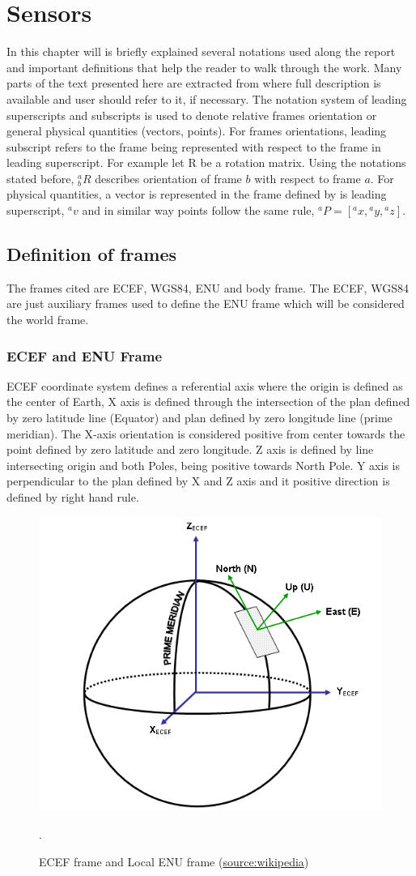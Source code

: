 \chapter{Sensors}
\label{chapter:Sensors}

In this chapter will is briefly explained several notations used along the report and
important definitions that help the reader to walk through the work. Many parts of the text presented here are extracted from \cite{thesis_BT} where full description is available and user should refer to it, if necessary. 
The notation system of leading superscripts and subscripts is used to denote
relative frames orientation or general physical quantities (vectors, points).
For frames orientations, leading subscript refers to the frame being represented
with respect to the frame in leading superscript. For example let R be a
rotation matrix. Using the notations stated before, ${}^a_bR$ describes
orientation of frame $b$ with respect to frame $a$. For physical quantities, a
vector is represented in the frame defined by is leading superscript,
${}^av$ and in similar way points follow the same rule,
${}^aP=[{}^ax,{}^ay,{}^az]$.


\section{Definition of frames} \label{section:frames}

The frames cited are \gls{ECEF}, \gls{WGS84},
\gls{ENU} and body frame. The \gls{ECEF}, \gls{WGS84} are just auxiliary frames
used to define the \gls{ENU} frame which will be considered the world frame.


\subsection{ECEF and ENU Frame}

\gls{ECEF} coordinate system defines a referential axis where the origin is
defined as the center of Earth, X axis is defined through the intersection of
the plan defined by zero latitude line (Equator) and plan defined by zero
longitude line (prime meridian). The X-axis orientation is considered positive
from center towards the point defined by zero latitude and zero longitude. Z axis
is defined by line intersecting origin and both Poles, being positive towards
North Pole. Y axis is perpendicular to the plan defined by X and Z axis and it
positive direction is defined by right hand rule.

\begin{figure}[!htb]
	\centering
	\includegraphics[width=0.3\linewidth]{figures/EarthTangentialPlane.png}
	\caption[ECEF frame and Local ENU frame.]{ECEF frame and Local ENU frame (\href{https://en.wikipedia.org/wiki/File:EarthTangentialPlane.png}{source:wikipedia})}. 
	\label{fig:ecef_enu} 
\end{figure}

